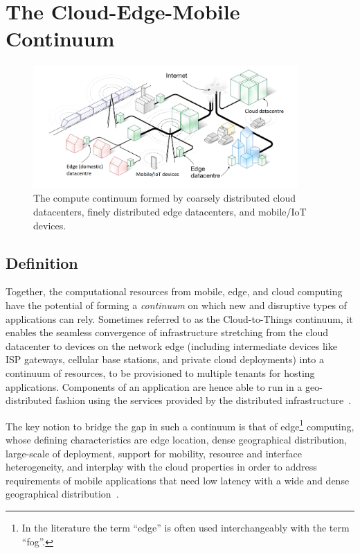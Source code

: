 \section{The Cloud-Edge-Mobile Continuum}\label{sec:continuum}

\begin{figure}[tbp]
	\includegraphics[width=0.9\textwidth]{figs/Continuum-overall.png}
	\caption{The compute continuum formed by coarsely distributed cloud datacenters, finely distributed edge datacenters, and mobile/IoT devices.}
	\label{fig:continuum-scenario}
\end{figure}

\subsection{Definition}

Together, the computational resources from mobile, edge, and cloud computing have the potential of forming a \textit{continuum} on which new and disruptive types of applications can rely. Sometimes referred to as the Cloud-to-Things continuum, it enables the seamless convergence of infrastructure stretching from the cloud datacenter to devices on the network edge (including intermediate devices like ISP gateways, cellular base stations, and private cloud deployments) into a continuum of resources, to be provisioned to multiple tenants for hosting applications. Components of an application are hence able to run in a geo-distributed fashion using the services provided by the distributed infrastructure~\cite{GuptaIfogSim17}. 

The key notion to bridge the gap in such a continuum is that of edge\footnote{In the literature the term ``edge'' is often used interchangeably with the term ``fog''.} computing, whose defining characteristics are edge location, dense geographical distribution, large-scale of deployment, support for mobility, resource and interface heterogeneity, and interplay with the cloud properties in order to address requirements of mobile applications that need low latency with a wide and dense geographical distribution~\cite{Bonomi2014}.  

